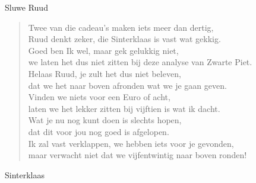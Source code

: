 \documentclass[12pt]{brief}
\begin{document}
\begin{letter}{Sluwe Ruud}
\begin{verse}
Twee van die cadeau's maken iets meer dan dertig,\\
Ruud denkt zeker, die Sinterklaas is vast wat gekkig.\\
Goed ben Ik wel, maar gek gelukkig niet,\\
we laten het dus niet zitten bij deze analyse van Zwarte Piet.\\[0.5em]

Helaas Ruud, je zult het dus niet beleven,\\
dat we het naar boven afronden wat we je gaan geven.\\
Vinden we niets voor een Euro of acht,\\
laten we het lekker zitten bij vijftien is wat ik dacht.\\[0.5em]

Wat je nu nog kunt doen is slechts hopen,\\
dat dit voor jou nog goed is afgelopen.\\
Ik zal vast verklappen, we hebben iets voor je gevonden,\\
maar verwacht niet dat we vijfentwintig naar boven ronden!\\[2em]

\end{verse}


Sinterklaas


\closing{}

\end{letter}
\end{document}
